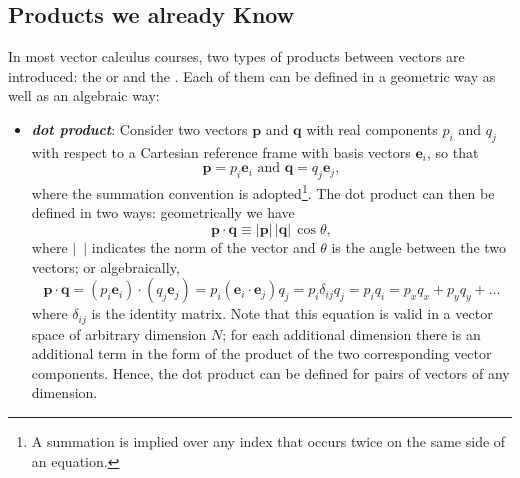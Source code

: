 \subsection{Products we already Know}\label{\chabbr:ssec:knownproducts}
In most vector calculus courses, two types of products between vectors are introduced: the  or  and the .  Each of them can be defined in a geometric way as well as an algebraic way:
\begin{itemize}
	\item \textbf{\textit{dot product}}: Consider two vectors $\mathbf{p}$ and $\mathbf{q}$ with real components $p_i$ and $q_j$ with respect to a Cartesian reference frame with basis vectors $\mathbf{e}_i$, so that
	\[
		\mathbf{p} = p_i\mathbf{e}_i\text{ and }\mathbf{q}=q_j\mathbf{e}_j,
	\]
	where the summation convention is adopted\footnote{A summation is implied over any index that occurs twice on the same side of an equation.}. The dot product can then be defined in two ways: geometrically we have
	\begin{equation}
		\mathbf{p}\cdot\mathbf{q} \equiv \vert\mathbf{p}\vert\,\vert\mathbf{q}\vert\,\cos\theta,
	\end{equation}
	where $\vert\,\,\,\vert$ indicates the norm of the vector and $\theta$ is the angle between the two vectors; or algebraically,
	\begin{equation}
		\mathbf{p}\cdot\mathbf{q} = (p_i\mathbf{e}_i)\cdot(q_j\mathbf{e}_j) = p_i (\mathbf{e}_i\cdot\mathbf{e}_j)q_j = p_i\delta_{ij}q_j=p_iq_i=p_xq_x+p_yq_y+\ldots
	\end{equation}
	where $\delta_{ij}$ is the identity matrix.  Note that this equation is valid in a vector space of arbitrary dimension $N$; for each additional dimension there is an additional term in the form of the product of the two corresponding vector components.  Hence, the dot product can be defined for pairs of vectors of any dimension.


\end{itemize}
